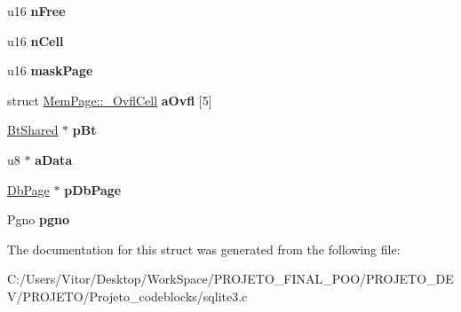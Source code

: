 \begin{DoxyCompactItemize}
\item 
\hypertarget{struct_mem_page_a3418a9aee707f57a73d8470f8a1228a8}{u16 {\bfseries n\-Free}}\label{struct_mem_page_a3418a9aee707f57a73d8470f8a1228a8}

\item 
\hypertarget{struct_mem_page_a35d1d8f836201b82b1eb778ce0e324f4}{u16 {\bfseries n\-Cell}}\label{struct_mem_page_a35d1d8f836201b82b1eb778ce0e324f4}

\item 
\hypertarget{struct_mem_page_aa3d64e8755cc9f431bbc8423a2b506ec}{u16 {\bfseries mask\-Page}}\label{struct_mem_page_aa3d64e8755cc9f431bbc8423a2b506ec}

\item 
\hypertarget{struct_mem_page_a4ac8901d1b123395f2abf3cc60105586}{struct \hyperlink{struct_mem_page_1_1___ovfl_cell}{Mem\-Page\-::\-\_\-\-Ovfl\-Cell} {\bfseries a\-Ovfl} \mbox{[}5\mbox{]}}\label{struct_mem_page_a4ac8901d1b123395f2abf3cc60105586}

\item 
\hypertarget{struct_mem_page_a949df1156f7392592eaeb64389068f99}{\hyperlink{struct_bt_shared}{Bt\-Shared} $\ast$ {\bfseries p\-Bt}}\label{struct_mem_page_a949df1156f7392592eaeb64389068f99}

\item 
\hypertarget{struct_mem_page_a2d873eff563d2208be0c24959140a4b0}{u8 $\ast$ {\bfseries a\-Data}}\label{struct_mem_page_a2d873eff563d2208be0c24959140a4b0}

\item 
\hypertarget{struct_mem_page_add322c1aed91e95d8dfe3ac3535d65b4}{\hyperlink{struct_pg_hdr}{Db\-Page} $\ast$ {\bfseries p\-Db\-Page}}\label{struct_mem_page_add322c1aed91e95d8dfe3ac3535d65b4}

\item 
\hypertarget{struct_mem_page_ad2b0c532abc799bbcf3b43df4f0b0546}{Pgno {\bfseries pgno}}\label{struct_mem_page_ad2b0c532abc799bbcf3b43df4f0b0546}

\end{DoxyCompactItemize}


The documentation for this struct was generated from the following file\-:\begin{DoxyCompactItemize}
\item 
C\-:/\-Users/\-Vitor/\-Desktop/\-Work\-Space/\-P\-R\-O\-J\-E\-T\-O\-\_\-\-F\-I\-N\-A\-L\-\_\-\-P\-O\-O/\-P\-R\-O\-J\-E\-T\-O\-\_\-\-D\-E\-V/\-P\-R\-O\-J\-E\-T\-O/\-Projeto\-\_\-codeblocks/sqlite3.\-c\end{DoxyCompactItemize}
